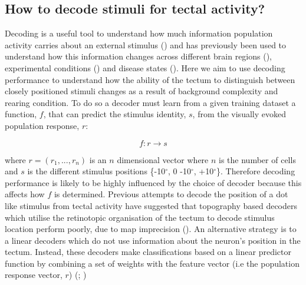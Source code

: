 \subsection{How to decode stimuli for tectal activity?}
Decoding is a useful tool to understand how much information population activity carries about an external stimulus (\cite{Raposo2014ADecision-making}) and has previously been used to understand how this information changes across different brain regions (\cite{vanderMeer2010TripleTask}), experimental conditions (\cite{Glaser2018PopulationCortex}) and disease states (\cite{Weygandt2012FMRIDisorder}). Here we aim to use decoding performance to understand how the ability of the tectum to distinguish between closely positioned stimuli changes as a result of background complexity and rearing condition. To do so a decoder must learn from a given training dataset a function, $f$, that can predict the stimulus identity, $s$, from the visually evoked population response, $r$:

\begin{equation}
    f: r \rightarrow{s}
\end{equation}

where $r = (r_{1}, ..., r_{n})$ is an $n$ dimensional vector where $n$ is the number of cells and $s$  is the different stimulus positions \{-10$^{\circ}$, 0 -10$^{\circ}$, +10$^{\circ}$\}. Therefore decoding performance is likely to be highly influenced by the choice of decoder because this affects how $f$ is determined. Previous attempts to decode the position of a dot like stimulus from tectal activity have suggested that topography based decoders which utilise the retinotopic organisation of the tectum to decode stimulus location perform poorly, due to map imprecision (\cite{Avitan2016}). An alternative strategy is to a linear decoders which do not use information about the neuron's position in the tectum. Instead, these decoders make classifications based on a linear predictor function by combining a set of weights with the feature vector (i.e the population response vector, $r$) (\cite{Avitan2016}; \cite{Avitan2019})

